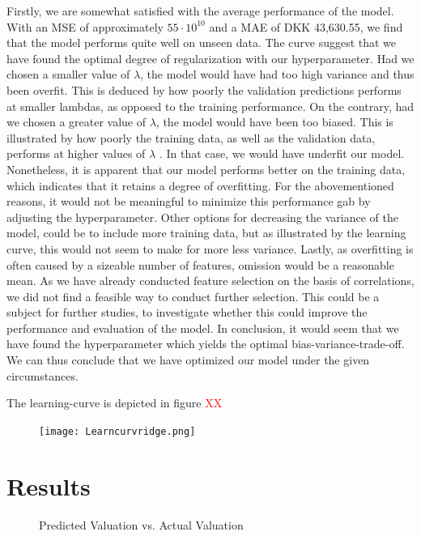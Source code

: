 \documentclass[12pt,a4paper]{article}
\begin{document}
Firstly, we are somewhat satisfied with the average performance of the model. With an MSE of approximately $55\cdot10^{10}$ and a MAE of DKK 43,630.55, we find that the model performs quite well on unseen data. 
The curve suggest that we have found the optimal degree of regularization with our hyperparameter. Had we chosen a smaller value of $\lambda$, the model would have had too high variance and thus been overfit. This is deduced by how poorly the validation predictions performs at smaller lambdas, as opposed to the training performance. On the contrary, had we chosen a greater value of $\lambda$, the model would have been too biased. This is illustrated by how poorly the training data, as well as the validation data, performs at higher values of $\lambda$ . In that case, we would have underfit our model. 
Nonetheless, it is apparent that our model performs better on the training data, which indicates that it retains a degree of overfitting. For the abovementioned reasons, it would not be meaningful to minimize this performance gab by adjusting the hyperparameter. Other options for decreasing the variance of the model, could be to include more training data, but as illustrated by the learning curve, this would not seem to make for more less variance. Lastly, as overfitting is often caused by a sizeable number of features, omission would be a reasonable mean. As we have already conducted feature selection on the basis of correlations, we did not find a feasible way to conduct further selection. This could be a subject for further studies, to investigate whether this could improve the performance and evaluation of the model. \newline
In conclusion, it would seem that we have found the hyperparameter which yields the optimal bias-variance-trade-off. We can thus conclude that we have optimized our model under the given circumstances. 

The learning-curve is depicted in figure \textcolor{red}{XX}
\begin{figure}[H]
\centering
\caption{}
\texttt{[image: Learncurvridge.png]}
\end{figure}



\section{Results}
\begin{figure}[H]
\centering
\caption{Predicted Valuation vs. Actual Valuation}
\end{figure}
\end{document}
